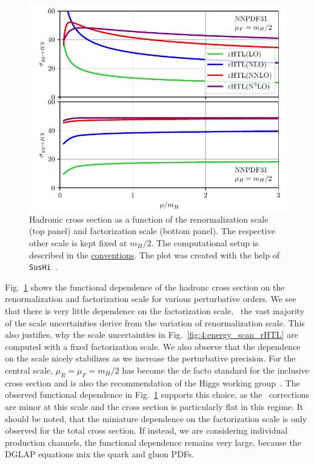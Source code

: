 \begin{figure}[h]
\centering
\includegraphics[width=\figurewidth]{Images/scale_scan.pdf}
\caption{Hadronic cross section as a function of the renormalization scale (top panel) and factorization scale (bottom panel). The respective other scale is kept fixed at $m_H/2$. The computational setup is described in the \hyperref[chap:notation_and_conventions]{conventions}. The plot was created with the help of \texttt{SusHi}~\cite{Harlander:2012pb, Harlander:2016hcx}.}
\label{fig:4:scale_scan}
\end{figure}
Fig.~\ref{fig:4:scale_scan} shows the functional dependence of the hadronc cross section on the renormalization and factorization scale for various perturbative orders. We see that there is very little dependence on the factorization scale, \ie\ the vast majority of the scale uncertainties derive from the variation of renormalization scale. This also justifies, why the scale uncertainties in Fig.~\ref{fig:4:energy_scan_rHTL} are computed with a fixed factorization scale. We also observe that the dependence on the scale nicely stabilizes as we increase the perturbative precision. For the central scale, $\mu_R = \mu_F = m_H/2$ has become the de facto standard for the inclusive cross section and is also the recommendation of the Higgs working group~\cite{LHCHiggsCrossSectionWorkingGroup:2016ypw}. The observed functional dependence in Fig.~\ref{fig:4:scale_scan} supports this choice, as the \NNNLO\ corrections are minor at this scale and the cross section is particularly flat in this regime. It should be noted, that the miniature dependence on the factorization scale is only observed for the total cross section. If instead, we are considering individual production channels, the functional dependence remains very large, because the DGLAP equations mix the quark and gluon \acs{PDF}s.

